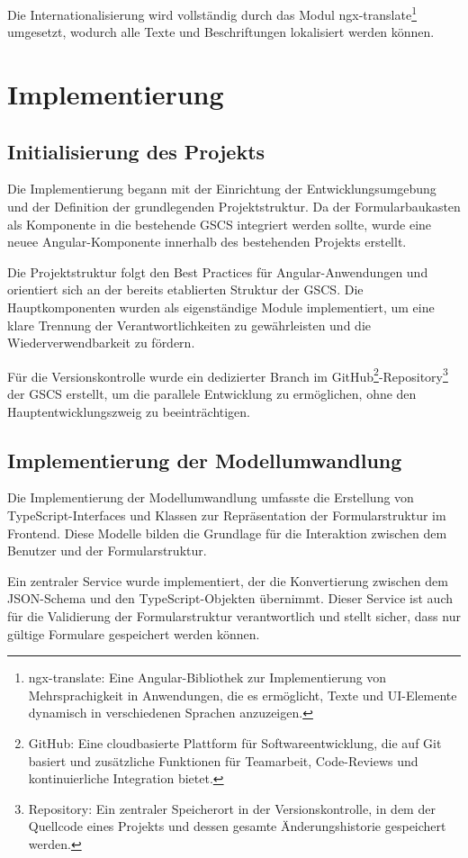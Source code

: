 \documentclass[a4paper,11pt]{article}
\begin{document}
\noindent Die Internationalisierung wird vollständig durch das Modul ngx-translate\footnote{ngx-translate: Eine Angular-Bibliothek zur Implementierung von Mehrsprachigkeit in Anwendungen, die es ermöglicht, Texte und UI-Elemente dynamisch in verschiedenen Sprachen anzuzeigen.} umgesetzt, wodurch alle Texte und Beschriftungen lokalisiert werden können.
\section{Implementierung}
\subsection{Initialisierung des Projekts}
Die Implementierung begann mit der Einrichtung der Entwicklungsumgebung und der Definition der grundlegenden Projektstruktur. Da der Formularbaukasten als Komponente in die bestehende GSCS integriert werden sollte, wurde eine neuee Angular-Komponente innerhalb des bestehenden Projekts erstellt.

\noindent Die Projektstruktur folgt den Best Practices für Angular-Anwendungen und orientiert sich an der bereits etablierten Struktur der GSCS. Die Hauptkomponenten wurden als eigenständige Module implementiert, um eine klare Trennung der Verantwortlichkeiten zu gewährleisten und die Wiederverwendbarkeit zu fördern.

\noindent Für die Versionskontrolle wurde ein dedizierter Branch im GitHub\footnote{GitHub: Eine cloudbasierte Plattform für Softwareentwicklung, die auf Git basiert und zusätzliche Funktionen für Teamarbeit, Code-Reviews und kontinuierliche Integration bietet.}-Repository\footnote{Repository: Ein zentraler Speicherort in der Versionskontrolle, in dem der Quellcode eines Projekts und dessen gesamte Änderungshistorie gespeichert werden.} der GSCS erstellt, um die parallele Entwicklung zu ermöglichen, ohne den Hauptentwicklungszweig zu beeinträchtigen.

\subsection{Implementierung der Modellumwandlung}
Die Implementierung der Modellumwandlung umfasste die Erstellung von TypeScript-Interfaces und Klassen zur Repräsentation der Formularstruktur im Frontend. Diese Modelle bilden die Grundlage für die Interaktion zwischen dem Benutzer und der Formularstruktur.

\noindent Ein zentraler Service wurde implementiert, der die Konvertierung zwischen dem JSON-Schema und den TypeScript-Objekten übernimmt. Dieser Service ist auch für die Validierung der Formularstruktur verantwortlich und stellt sicher, dass nur gültige Formulare gespeichert werden können.
\end{document}
